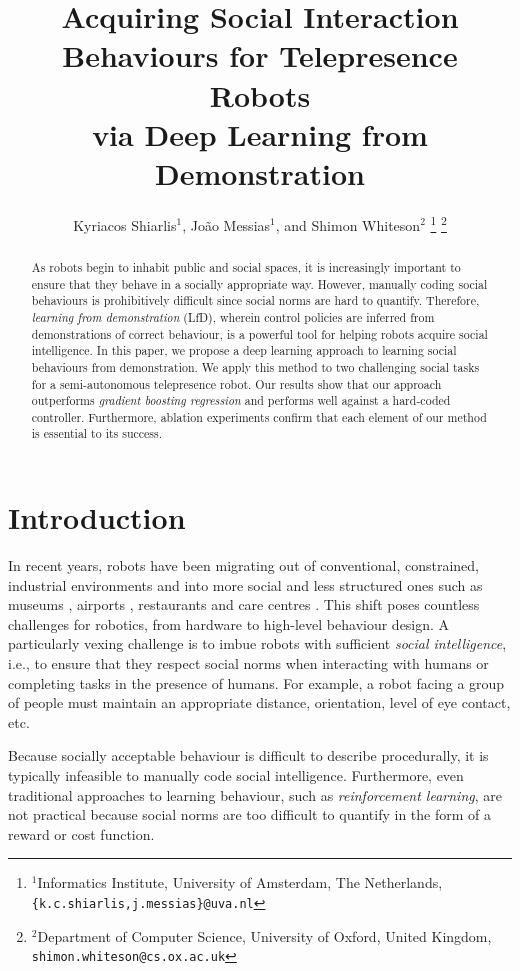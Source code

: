 \documentclass[letterpaper, 10 pt, conference]{ieeeconf}
\title{\LARGE \bf
Acquiring Social Interaction Behaviours for Telepresence Robots\\via Deep Learning from Demonstration 
}
\author{Kyriacos Shiarlis$^{1}$, Jo\~ao Messias$^{1}$, and Shimon Whiteson$^{2}$%
\thanks{$^{1}$Informatics Institute, University of Amsterdam, The Netherlands,
         {\tt\small \{k.c.shiarlis,j.messias\}@uva.nl}}%
\thanks{$^{2}$Department of Computer Science, University of Oxford, United Kingdom,
         {\tt\small shimon.whiteson@cs.ox.ac.uk}}%
}
\begin{document}
\maketitle

\thispagestyle{empty}
\pagestyle{empty}


\begin{abstract}
As robots begin to inhabit public and social spaces, it is increasingly important to ensure that they behave in a socially appropriate way. However, manually coding social behaviours is prohibitively difficult since social norms are hard to quantify.  Therefore, \emph{learning from demonstration} (LfD), wherein control policies are inferred from demonstrations of correct behaviour, is a powerful tool for helping robots acquire social intelligence. In this paper, we propose a deep learning approach to learning social behaviours from demonstration.  We apply this method to two challenging social tasks for a semi-autonomous telepresence robot.  Our results show that our approach outperforms \emph{gradient boosting regression} and performs well against a hard-coded controller.  Furthermore, ablation experiments confirm that each element of our method is essential to its success.
\end{abstract}

\section{Introduction}


In recent years, robots have been migrating out of conventional, constrained, industrial environments and into more social and less structured ones such as museums \cite{thrun1999minerva}, airports \cite{triebel2015spencer}, restaurants \cite{qing2010research} and care centres \cite{shiarlis2015teresa}. This shift poses countless challenges for robotics, from hardware  to high-level behaviour design.  A particularly vexing challenge is to imbue robots with sufficient \emph{social intelligence}, i.e., to ensure that they respect social norms when interacting with humans or completing tasks in the presence of humans.  For example, a robot facing a group of people must maintain an appropriate distance, orientation, level of eye contact, etc.

Because socially acceptable behaviour is difficult to describe procedurally, it is typically infeasible to manually code social intelligence.  Furthermore, even traditional approaches to learning behaviour, such as \emph{reinforcement learning}, are not practical because social norms are too difficult to quantify in the form of a reward or cost function.
\end{document}
